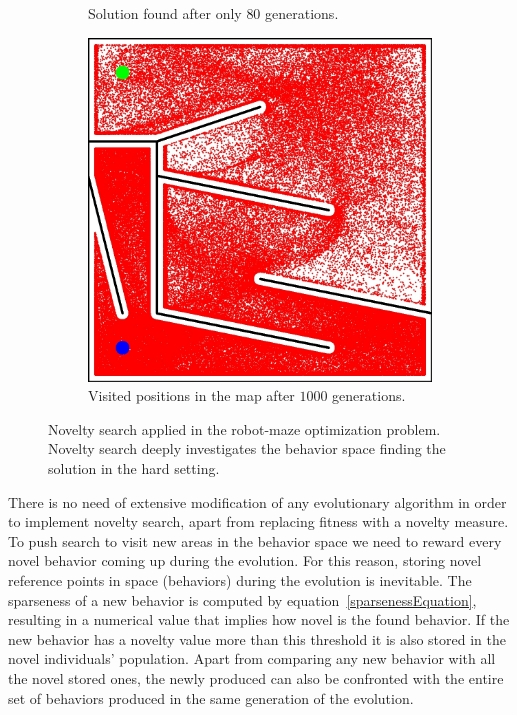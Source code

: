 \begin{figure}[t!]
\begin{subfigure}[b]{0.3\textwidth}
\caption{Solution found after only $80$ generations.}
\label{fig:mazeNoveltyHardSolution}
\end{subfigure}\hspace{0.3cm}
\begin{subfigure}[b]{0.3\textwidth}
\includegraphics[width=1.0\textwidth]{../Figures/Misc/MazeHardNovelty.jpg}
\caption{ Visited positions in the map after $1000$ generations.}
\label{fig:mazeNoveltyHard}
\end{subfigure}
\caption{Novelty search applied in the robot-maze optimization problem. Novelty search deeply investigates the behavior space finding the solution in the hard setting.}
\label{fig:mazeNovelty}
\end{figure}

There is no need of extensive modification of any evolutionary algorithm in order to implement novelty search, apart from replacing fitness with a novelty measure. To push search to visit new areas in the behavior space we need to reward every novel behavior coming up during the evolution. For this reason, storing novel reference points in space (behaviors) during the evolution is inevitable. The sparseness of a new behavior is computed by equation~\ref{sparsenessEquation}, resulting in a numerical value that implies how novel is the found behavior. If the new behavior has a novelty value more than this threshold it is also stored in the novel individuals' population. Apart from comparing any new behavior with all the novel stored ones, the newly produced can also be confronted with the entire set of behaviors produced in the same generation of the evolution. 

